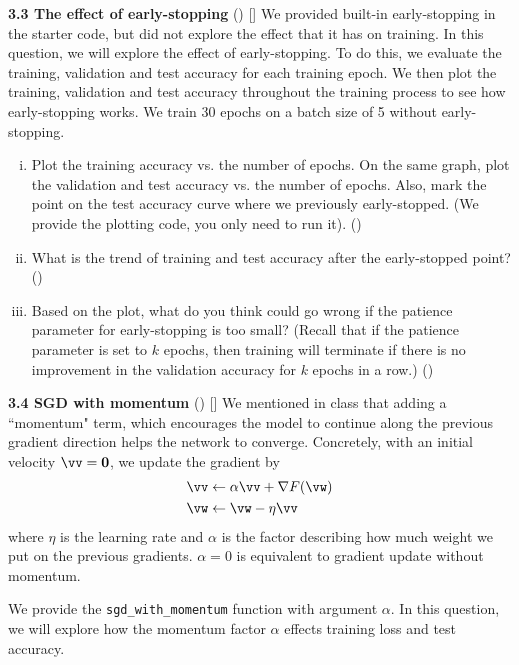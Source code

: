 \textbf{3.3 The effect of early-stopping} () [] We provided built-in early-stopping in the starter code, but did not explore the effect that it has on training. In this question, we will explore the effect of early-stopping. To do this, we evaluate the training, validation and test accuracy for each training epoch. We then plot the training, validation and test accuracy throughout the training process to see how early-stopping works.
We train 30 epochs on a batch size of 5 without early-stopping.
\begin{enumerate}[(i).]
    \item Plot the training accuracy vs. the number of epochs. On the same graph, plot the validation and test accuracy vs. the number of epochs. Also, mark the point on the test accuracy curve where we previously early-stopped. (We provide the plotting code, you only need to run it). ()
    \item What is the trend of training and test accuracy after the early-stopped point? ()
    \item Based on the plot, what do you think could go wrong if the patience parameter for early-stopping is too small? (Recall that if the patience parameter is set to $k$ {epochs}, then  training will terminate if there is no improvement in the validation accuracy for $k$ epochs in a row.) ()
\end{enumerate}


\textbf{3.4 SGD with momentum} () []
We mentioned in class that adding a ``momentum" term, which encourages the model to continue along the previous gradient direction helps the network to converge. Concretely, with an initial velocity $\vv=\mathbf{0}$, we update the gradient by
\begin{align*}
    \vv & \leftarrow \alpha \vv + \nabla F(\vw) \\
    \vw & \leftarrow \vw - \eta \vv
\end{align*}
where $\eta$ is the learning rate and $\alpha$ is the factor describing how much weight we put on the previous gradients. $\alpha=0$ is equivalent to gradient update without momentum. 

We provide the \texttt{sgd\_with\_momentum} function with argument $\alpha$. In this question, we will explore how the  momentum factor $\alpha$ effects training loss and test accuracy.

